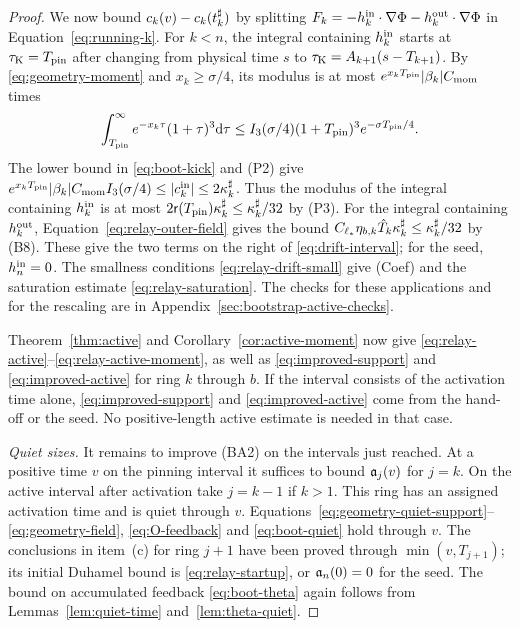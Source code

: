 \begin{proof}
We now bound $c_k(v)-c_k(t^\sharp_k)$ by splitting
$F_k=-h^{\mathrm{in}}_k\cdot\nabla\Phi-h^{\mathrm{out}}_k\cdot\nabla\Phi$ in
Equation~\eqref{eq:running-k}. For $k<n$, the integral containing
$h^{\mathrm{in}}_k$ starts at $\tau_{\mathrm{K}}=T_{\mathrm{pin}}$ after changing from physical time $s$
to $\tau_{\mathrm{K}}=A_{k+1}(s-T_{k+1})$. By \eqref{eq:geometry-moment} and
$x_k\ge\sigma/4$, its modulus is at most $e^{x_kT_{\mathrm{pin}}}|\beta_k|C_{\mathrm{mom}}$ times
\begin{equation}
\label{eq:relay-moment-tail}
\int_{T_{\mathrm{pin}}}^{\infty} e^{-x_k\tau}(1+\tau)^3\dd\tau
\le I_3(\sigma/4)(1+T_{\mathrm{pin}})^3e^{-\sigma T_{\mathrm{pin}}/4}.
\end{equation}
The lower bound in \eqref{eq:boot-kick} and (P2) give
$e^{x_kT_{\mathrm{pin}}}|\beta_k|C_{\mathrm{mom}} I_3(\sigma/4)\le |c^{\mathrm{in}}_k|\le2\kappa^\sharp_k$.
Thus the modulus of the integral containing $h^{\mathrm{in}}_k$ is at most
$2\mathsf{r}(T_{\mathrm{pin}})\kappa^\sharp_k\le\kappa^\sharp_k/32$ by (P3).
For the integral containing $h^{\mathrm{out}}_k$, Equation~\eqref{eq:relay-outer-field}
gives the bound $C_{\ell_*}\eta_{b,k}\hat T_k\kappa^\sharp_k\le\kappa^\sharp_k/32$ by (B8).
These give the two terms on the right of \eqref{eq:drift-interval};
for the seed, $h^{\mathrm{in}}_n=0$. The smallness conditions
\eqref{eq:relay-drift-small} give (Coef) and the saturation estimate
\eqref{eq:relay-saturation}. The checks for these applications and
for the rescaling are in Appendix~\ref{sec:bootstrap-active-checks}.

Theorem~\ref{thm:active} and Corollary~\ref{cor:active-moment} now give
\eqref{eq:relay-active}--\eqref{eq:relay-active-moment}, as well as
\eqref{eq:improved-support} and \eqref{eq:improved-active} for ring $k$
through $b$. If the interval consists of the activation time alone,
\eqref{eq:improved-support} and \eqref{eq:improved-active}
come from the hand-off or the seed. No positive-length active estimate is
needed in that case.

\label{par:relay-quiet-size}
\emph{Quiet sizes.}
It remains to improve (BA2) on the intervals just reached. At a positive
time $v$ on the pinning interval it suffices to bound $\mathfrak{a}_j(v)$ for $j=k$.
On the active interval after activation take $j=k-1$ if $k>1$. This ring
has an assigned activation time and is quiet through $v$.
Equations~\eqref{eq:geometry-quiet-support}--\eqref{eq:geometry-field},
\eqref{eq:O-feedback} and \eqref{eq:boot-quiet} hold through $v$.
The conclusions in item~(c) for ring $j+1$ have been proved through
$\min(v,T_{j+1})$; its initial Duhamel bound is
\eqref{eq:relay-startup}, or $\mathfrak{a}_n(0)=0$ for the seed.
The bound on accumulated feedback \eqref{eq:boot-theta}
again follows from Lemmas~\ref{lem:quiet-time} and~\ref{lem:theta-quiet}.


\end{proof}
